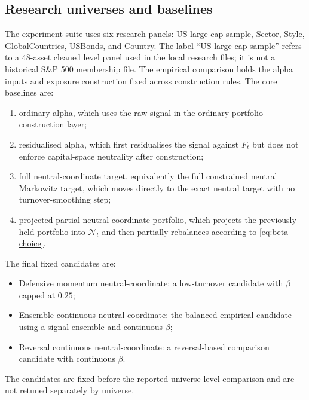 \documentclass[11pt]{article}
\newcommand{\N}{\mathcal{N}}
\begin{document}
\subsection{Research universes and baselines}

The experiment suite uses six research panels: US large-cap sample, Sector, Style, GlobalCountries,
USBonds, and Country. The label ``US large-cap sample'' refers to a 48-asset cleaned level panel used in
the local research files; it is not a historical S\&P 500 membership file. The empirical comparison
holds the alpha inputs and exposure construction fixed across
construction rules.  The core baselines are:
\begin{enumerate}[leftmargin=1.5em]
\item ordinary alpha, which uses the raw signal in the ordinary portfolio-construction layer;
\item residualised alpha, which first residualises the signal against $F_t$ but does not enforce capital-space
neutrality after construction;
\item full neutral-coordinate target, equivalently the full constrained neutral Markowitz target, which moves directly to the exact neutral target with no turnover-smoothing step;
\item projected partial neutral-coordinate portfolio, which projects the previously held portfolio into $\N_t$ and then partially
rebalances according to \eqref{eq:beta-choice}.
\end{enumerate}
The final fixed candidates are:
\begin{itemize}[leftmargin=1.5em]
\item Defensive momentum neutral-coordinate: a low-turnover candidate with $\beta$ capped at $0.25$;
\item Ensemble continuous neutral-coordinate: the balanced empirical candidate using a signal ensemble and
continuous $\beta$;
\item Reversal continuous neutral-coordinate: a reversal-based comparison candidate with continuous $\beta$.
\end{itemize}
The candidates are fixed before the reported universe-level comparison and are not retuned separately by
universe.
\end{document}
